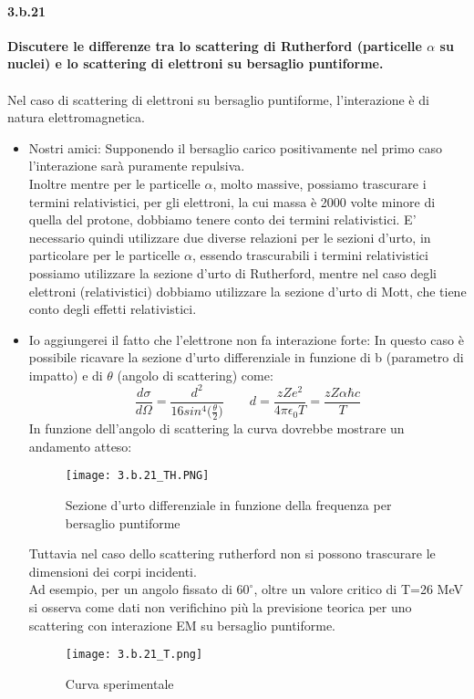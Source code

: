 \documentclass[twoside]{article}
\begin{document}
\paragraph{3.b.21}\textbf{Discutere le differenze tra lo scattering di Rutherford (particelle $\alpha$ su nuclei) e lo
scattering di elettroni su bersaglio puntiforme.}\\ \\
Nel caso di scattering di elettroni su bersaglio puntiforme, l'interazione è di natura elettromagnetica.\\
\begin{itemize}
    \item Nostri amici: Supponendo il bersaglio carico positivamente nel primo caso l'interazione sarà puramente repulsiva.\\
Inoltre mentre per le particelle $\alpha$, molto massive, possiamo trascurare i termini relativistici, per gli elettroni, la cui massa è 2000 volte minore di quella del protone, dobbiamo tenere conto dei
termini relativistici. E’ necessario quindi utilizzare due diverse relazioni per le sezioni d’urto, in particolare per le particelle $\alpha$, essendo trascurabili i termini relativistici possiamo utilizzare la sezione d’urto di Rutherford, mentre
nel caso degli elettroni (relativistici) dobbiamo utilizzare la sezione d’urto di Mott, che tiene conto degli effetti relativistici.
\item Io aggiungerei il fatto che l'elettrone non fa interazione forte:
In questo caso è possibile ricavare la sezione d'urto differenziale in funzione di b (parametro di impatto) e di $\theta$ (angolo di scattering) come:
\begin{equation}
    \frac{d\sigma}{d\Omega}=\frac{d^2}{16sin^4\biggl(\frac{\theta}{2}\biggr)} \qquad d=\frac{zZe^2}{4\pi\epsilon_0 T}=\frac{zZ\alpha \hbar c}{T}
\end{equation}
In funzione dell'angolo di scattering la curva dovrebbe mostrare un andamento atteso:\\
\begin{figure}[H]
    \centering
    \texttt{[image: 3.b.21\_TH.PNG]}
    \caption{Sezione d'urto differenziale in funzione della frequenza per bersaglio puntiforme}
    \label{3.b.21_TH}
\end{figure}
    Tuttavia nel caso dello scattering rutherford non si possono trascurare le dimensioni dei corpi incidenti.\\
    Ad esempio, per un angolo fissato di $60^\circ$, oltre un valore critico di T=26 MeV si osserva come dati non verifichino più la previsione teorica per uno scattering con interazione EM su bersaglio puntiforme.\\
\begin{figure}[H]
    \centering
    \texttt{[image: 3.b.21\_T.png]}
    \caption{Curva sperimentale}
    \label{3.b.21_T}
\end{figure}
    \end{itemize}
    
\end{document}
